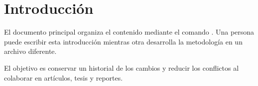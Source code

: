 \section{Introducción}
El documento principal organiza el contenido mediante el comando
\verb||. Una persona puede escribir esta introducción mientras otra
desarrolla la metodología en un archivo diferente.

El objetivo es conservar un historial de los cambios y reducir los conflictos
al colaborar en artículos, tesis y reportes.
